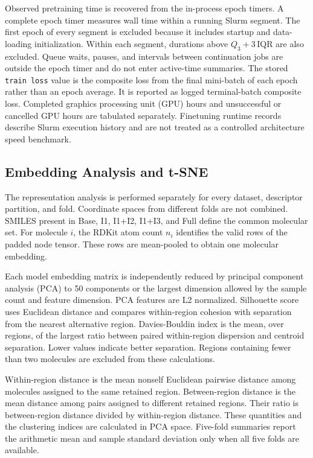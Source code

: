 \documentclass[journal=jcisd8,manuscript=article]{achemso}
\begin{document}
Observed pretraining time is recovered from the in-process epoch timers. A complete epoch timer measures wall time within a running Slurm segment. The first epoch of every segment is excluded because it includes startup and data-loading initialization. Within each segment, durations above \(Q_3+3\,\mathrm{IQR}\) are also excluded. Queue waits, pauses, and intervals between continuation jobs are outside the epoch timer and do not enter active-time summaries. The stored \texttt{train loss} value is the composite loss from the final mini-batch of each epoch rather than an epoch average. It is reported as logged terminal-batch composite loss. Completed graphics processing unit (GPU) hours and unsuccessful or cancelled GPU hours are tabulated separately. Finetuning runtime records describe Slurm execution history and are not treated as a controlled architecture speed benchmark.

\subsection{Embedding Analysis and t-SNE}

The representation analysis is performed separately for every dataset, descriptor partition, and fold. Coordinate spaces from different folds are not combined. SMILES present in Base, I1, I1+I2, I1+I3, and Full define the common molecular set. For molecule \(i\), the RDKit atom count \(n_i\) identifies the valid rows of the padded node tensor. These rows are mean-pooled to obtain one molecular embedding.

Each model embedding matrix is independently reduced by principal component analysis (PCA) to 50 components or the largest dimension allowed by the sample count and feature dimension. PCA features are L2 normalized. Silhouette score uses Euclidean distance and compares within-region cohesion with separation from the nearest alternative region. Davies-Bouldin index is the mean, over regions, of the largest ratio between paired within-region dispersion and centroid separation. Lower values indicate better separation. Regions containing fewer than two molecules are excluded from these calculations.

Within-region distance is the mean nonself Euclidean pairwise distance among molecules assigned to the same retained region. Between-region distance is the mean distance among pairs assigned to different retained regions. Their ratio is between-region distance divided by within-region distance. These quantities and the clustering indices are calculated in PCA space. Five-fold summaries report the arithmetic mean and sample standard deviation only when all five folds are available.
\end{document}
